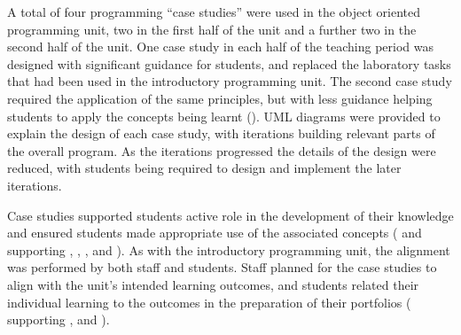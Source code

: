 A total of four programming ``case studies'' were used in the object oriented programming unit, two in the first half of the unit and a further two in the second half of the unit. One case study in each half of the teaching period was designed with significant guidance for students, and replaced the laboratory tasks that had been used in the introductory programming unit. The second case study required the application of the same principles, but with less guidance helping students to apply the concepts being learnt (). UML diagrams were provided to explain the design of each case study, with iterations building relevant parts of the overall program. As the iterations progressed the details of the design were reduced, with students being required to design and implement the later iterations. 

Case studies supported students active role in the development of their knowledge and ensured students made appropriate use of the associated concepts ( and  supporting , , , and ). As with the introductory programming unit, the alignment was performed by both staff and students. Staff planned for the case studies to align with the unit's intended learning outcomes, and students related their individual learning to the outcomes in the preparation of their portfolios ( supporting ,  and ).

\clearpage

